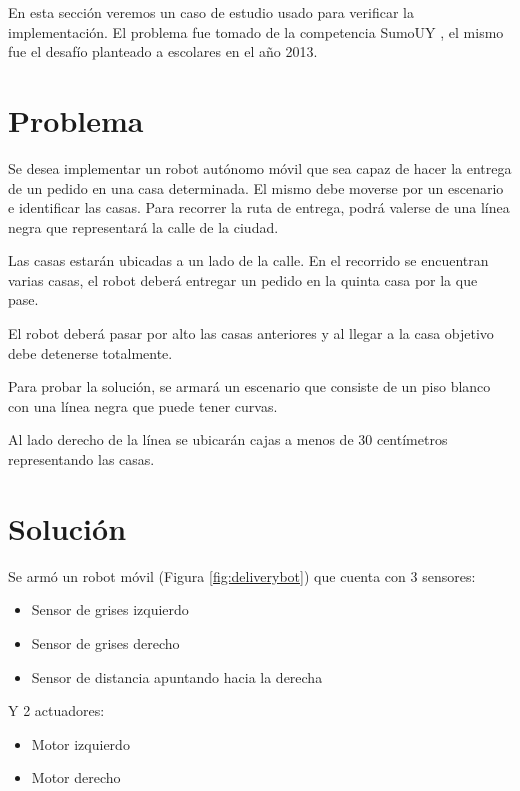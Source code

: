 
  En esta sección veremos un caso de estudio usado para verificar la
implementación.
  El problema fue tomado de la competencia SumoUY \cite{sumouy}, el mismo
fue el desafío planteado a escolares en el año 2013.

\section {Problema}


  Se desea implementar un robot autónomo móvil que sea capaz de
hacer la entrega de un pedido en una casa determinada.
  El mismo debe moverse por un escenario e identificar las casas.
  Para recorrer la ruta de entrega, podrá valerse de una línea negra
que representará la calle de la ciudad.

  Las casas estarán ubicadas a un lado de la calle. En el recorrido
se encuentran varias casas, el robot deberá entregar un pedido
en la quinta casa por la que pase.

  El robot deberá pasar por alto las casas anteriores y
al llegar a la casa objetivo debe detenerse totalmente.

  Para probar la solución, se armará un escenario que consiste de
un piso blanco con una línea negra que puede tener curvas.

  Al lado derecho de la línea se ubicarán cajas a menos de 30
centímetros representando las casas.

\section {Solución}

Se armó un robot móvil (Figura \ref{fig:deliverybot}) que cuenta con 3 sensores:

\begin{itemize}
\item Sensor de grises izquierdo
\item Sensor de grises derecho
\item Sensor de distancia apuntando hacia la derecha
\end{itemize}

  Y 2 actuadores:

\begin{itemize}
\item Motor izquierdo
\item Motor derecho 
\end{itemize}

